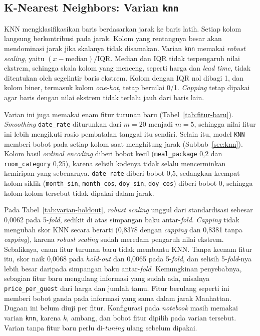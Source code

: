 \subsection{K-Nearest Neighbors: Varian \texttt{knn}}

KNN mengklasifikasikan baris berdasarkan jarak ke baris latih. Setiap kolom
langsung berkontribusi pada jarak. Kolom yang rentangnya besar akan mendominasi
jarak jika skalanya tidak disamakan. Varian \texttt{knn} memakai \textit{robust
scaling}, yaitu $(x-\mathrm{median})/\mathrm{IQR}$. Median dan IQR tidak
terpengaruh nilai ekstrem, sehingga skala kolom yang menceng, seperti harga dan
\textit{lead time}, tidak ditentukan oleh segelintir baris ekstrem. Kolom dengan
IQR nol dibagi 1, dan kolom biner, termasuk kolom \textit{one-hot}, tetap bernilai
0/1. \textit{Capping} tetap dipakai agar baris dengan nilai ekstrem tidak terlalu
jauh dari baris lain.

Varian ini juga memakai enam fitur turunan baru (Tabel~\ref{tab:fitur-baru}).
\textit{Smoothing} \texttt{date\_rate} diturunkan dari $m=20$ menjadi $m=5$,
sehingga nilai fitur ini lebih mengikuti rasio pembatalan tanggal itu sendiri.
Selain itu, model \texttt{KNN} memberi bobot pada setiap kolom saat menghitung
jarak (Subbab~\ref{sec:knn}). Kolom hasil \textit{ordinal encoding} diberi bobot
kecil (\texttt{meal\_package} 0,2 dan \texttt{room\_category} 0,25), karena
selisih kodenya tidak selalu mencerminkan kemiripan yang sebenarnya.
\texttt{date\_rate} diberi bobot 0,5, sedangkan keempat kolom siklik
(\texttt{month\_sin}, \texttt{month\_cos}, \texttt{doy\_sin}, \texttt{doy\_cos})
diberi bobot 0, sehingga kolom-kolom tersebut tidak dipakai dalam jarak.

Pada Tabel~\ref{tab:varian-holdout}, \textit{robust scaling} unggul dari
standardisasi sebesar 0,0062 pada 5-\textit{fold}, sedikit di atas simpangan baku
antar-\textit{fold}. \textit{Capping} tidak mengubah skor KNN
secara berarti (0,8378 dengan \textit{capping} dan 0,8381 tanpa
\textit{capping}), karena \textit{robust scaling} sudah meredam pengaruh nilai
ekstrem. Sebaliknya, enam fitur turunan baru tidak
membantu KNN. Tanpa keenam fitur itu, skor naik 0,0068 pada \textit{hold-out} dan
0,0065 pada 5-\textit{fold}, dan selisih 5-\textit{fold}-nya lebih besar daripada
simpangan baku antar-\textit{fold}. Kemungkinan penyebabnya, sebagian fitur baru
mengulang informasi yang sudah ada, misalnya \texttt{price\_per\_guest} dari harga
dan jumlah tamu. Fitur berulang seperti ini memberi bobot ganda pada informasi
yang sama dalam jarak Manhattan. Dugaan ini belum diuji per fitur. Konfigurasi
pada \textit{notebook} masih memakai varian \texttt{knn}, karena $k$, ambang, dan
bobot fitur dipilih pada varian tersebut. Varian tanpa fitur baru perlu
di-\textit{tuning} ulang sebelum dipakai.

